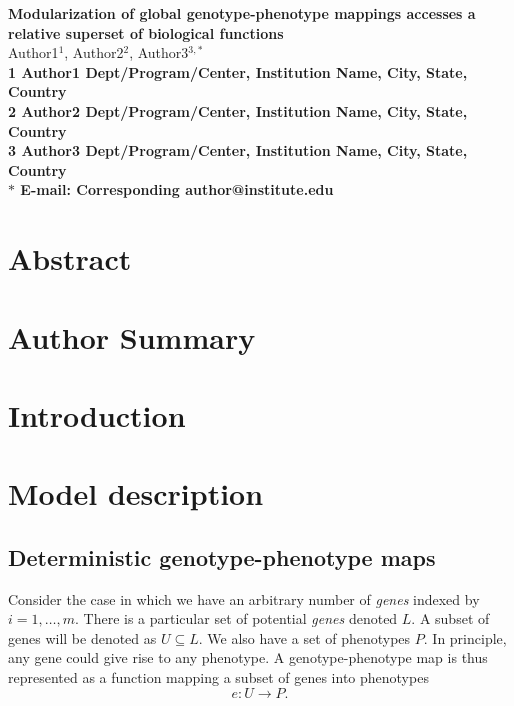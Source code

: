 



\begin{flushleft}
{\Large
\textbf{Modularization of global genotype-phenotype mappings accesses a relative superset of biological functions}
}
\\
Author1$^{1}$,
Author2$^{2}$,
Author3$^{3,\ast}$
\\
\bf{1} Author1 Dept/Program/Center, Institution Name, City, State, Country
\\
\bf{2} Author2 Dept/Program/Center, Institution Name, City, State, Country
\\
\bf{3} Author3 Dept/Program/Center, Institution Name, City, State, Country
\\
$\ast$ E-mail: Corresponding author@institute.edu
\end{flushleft}

\section*{Abstract}


\section*{Author Summary}

\section*{Introduction}



\section*{Model description}

\subsection*{Deterministic genotype-phenotype maps}
Consider the case in which we have an arbitrary number of \emph{genes} indexed by $i=1, \ldots, m$. There is a particular set of potential \emph{genes} denoted $L$. A subset of genes will be denoted as $U \subseteq L$. We also have a set of phenotypes $P$. In principle, any gene could give rise to any phenotype. A genotype-phenotype map is thus represented as a function mapping a subset of genes into phenotypes
$$
e \colon U \rightarrow  P.
$$

